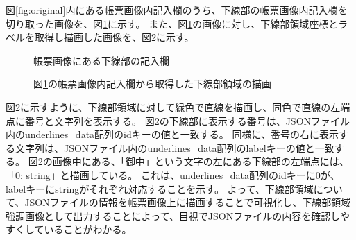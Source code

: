 図\ref{fig:original}内にある帳票画像内記入欄のうち、下線部の帳票画像内記入欄を切り取った画像を、図\ref{fig:underline_original}に示す。
また、図\ref{fig:underline_original}の画像に対し、下線部領域座標とラベルを取得し描画した画像を、図\ref{fig:underline_drawing}に示す。

\begin{figure}[tp]
    \begin{center}
        \caption{帳票画像にある下線部の記入欄}
        \label{fig:underline_original}
    \end{center}
\end{figure}

\begin{figure}[htp]
    \begin{center}
        \caption{図\ref{fig:underline_original}の帳票画像内記入欄から取得した下線部領域の描画}
        \label{fig:underline_drawing}
    \end{center}
\end{figure}

図\ref{fig:underline_drawing}に示すように、下線部領域に対して緑色で直線を描画し、同色で直線の左端点に番号と文字列を表示する。
図\ref{fig:underline_drawing}の下線部に表示する番号は、JSONファイル内のunderlines\_data配列のidキーの値と一致する。
同様に、番号の右に表示する文字列は、JSONファイル内のunderlines\_data配列のlabelキーの値と一致する。
図\ref{fig:underline_drawing}の画像中にある、「御中」という文字の左にある下線部の左端点には、「0: string」と描画している。
これは、underlines\_data配列のidキーに0が、labelキーにstringがそれぞれ対応することを示す。
よって、下線部領域について、JSONファイルの情報を帳票画像上に描画することで可視化し、下線部領域強調画像として出力することによって、目視でJSONファイルの内容を確認しやすくしていることがわかる。